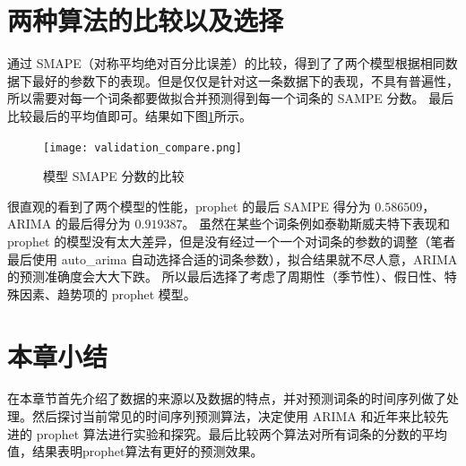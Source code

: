 \section{两种算法的比较以及选择}

通过 SMAPE（对称平均绝对百分比误差）的比较，得到了了两个模型根据相同数据下最好的参数下的表现。但是仅仅是针对这一条数据下的表现，不具有普遍性，所以需要对每一个词条都要做拟合并预测得到每一个词条的 SAMPE 分数。
最后比较最后的平均值即可。结果如下图\ref{compare_model2}所示。

\begin{figure}[htbp]
	\centering
	\texttt{[image: validation\_compare.png]}
	\caption{模型 SMAPE 分数的比较}
	\label{compare_model2}
\end{figure}

很直观的看到了两个模型的性能，prophet 的最后 SAMPE 得分为 $0.586509$，ARIMA 的最后得分为 $0.919387$。
虽然在某些个词条例如泰勒斯威夫特下表现和 prophet 的模型没有太大差异，但是没有经过一个一个对词条的参数的调整（笔者最后使用 auto\_arima 自动选择合适的词条参数），拟合结果就不尽人意，ARIMA 的预测准确度会大大下跌。
所以最后选择了考虑了周期性（季节性）、假日性、特殊因素、趋势项的 prophet 模型。

\section{本章小结}

在本章节首先介绍了数据的来源以及数据的特点，并对预测词条的时间序列做了处理。然后探讨当前常见的时间序列预测算法，决定使用 ARIMA 和近年来比较先进的 prophet 算法进行实验和探究。最后比较两个算法对所有词条的分数的平均值，结果表明prophet算法有更好的预测效果。
